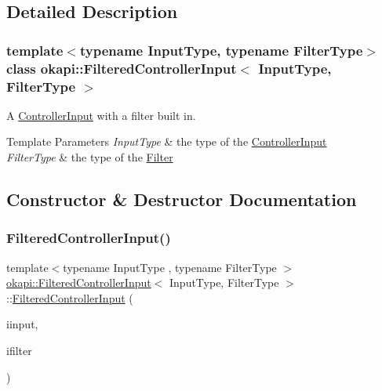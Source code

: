 \subsection{Detailed Description}
\subsubsection*{template$<$typename Input\+Type, typename Filter\+Type$>$\newline
class okapi\+::\+Filtered\+Controller\+Input$<$ Input\+Type, Filter\+Type $>$}

A \mbox{\hyperlink{classokapi_1_1ControllerInput}{Controller\+Input}} with a filter built in.


\begin{DoxyTemplParams}{Template Parameters}
{\em Input\+Type} & the type of the \mbox{\hyperlink{classokapi_1_1ControllerInput}{Controller\+Input}} \\
\hline
{\em Filter\+Type} & the type of the \mbox{\hyperlink{classokapi_1_1Filter}{Filter}} \\
\hline
\end{DoxyTemplParams}


\subsection{Constructor \& Destructor Documentation}
\mbox{\label{classokapi_1_1FilteredControllerInput_af39910d3a47b6b6bda5ca86b40667ace}} 
\subsubsection{\texorpdfstring{FilteredControllerInput()}{FilteredControllerInput()}}
{\footnotesize\ttfamily template$<$typename Input\+Type , typename Filter\+Type $>$ \\
\mbox{\hyperlink{classokapi_1_1FilteredControllerInput}{okapi\+::\+Filtered\+Controller\+Input}}$<$ Input\+Type, Filter\+Type $>$\+::\mbox{\hyperlink{classokapi_1_1FilteredControllerInput}{Filtered\+Controller\+Input}} (\begin{DoxyParamCaption}\item[{std\+::unique\+\_\+ptr$<$ \mbox{\hyperlink{classokapi_1_1ControllerInput}{Controller\+Input}}$<$ Input\+Type $>$$>$}]{iinput,  }\item[{std\+::unique\+\_\+ptr$<$ Filter\+Type $>$}]{ifilter }\end{DoxyParamCaption})\hspace{0.3cm}{\ttfamily [inline]}}

